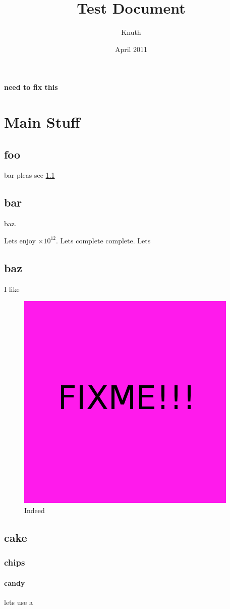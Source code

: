 \documentclass[12pt]{book}
\title{Test Document}
\author{Knuth}
\date{April 2011}
\newcommand{\testcite}[1]{\cite{#1}}
\newcommand{\teste}[1]{\ensuremath{\times 10^{#1}}}
\newcommand{\testissue}[1]{\textbf{#1}}
\begin{document}
\maketitle

\testissue{need to fix this}

\chapter{Main Stuff}
\section{foo}
bar pleas see \ref{fig:fixme}

\section{bar}
baz.

Lets enjoy \teste{12}. Lets complete complete. Lets \testcite{dijkstra68}


\section{baz}
I like \cite{dijkstra76}

\begin{figure}
    \centering
	\includegraphics[scale=1.00]{FIXME}
	\caption{Indeed}
	\label{fig:fixme}
\end{figure}

\section{cake}
\subsection{chips}
\subsubsection{candy}

lets use a \testcite{dijkstra68}






\end{document}
